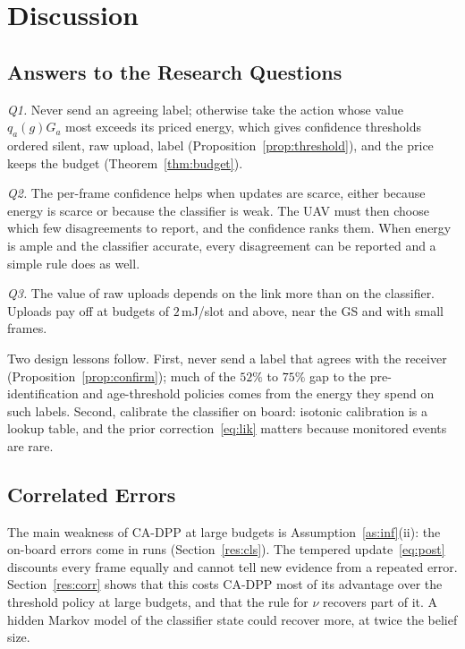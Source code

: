 \documentclass[5p,twocolumn]{elsarticle}
\theoremstyle{remark}
\begin{document}
\section{Discussion}\label{sec:discussion}
\subsection{Answers to the Research Questions}
\emph{Q1.} Never send an agreeing label; otherwise take the action whose value $q_a(g)G_a$ most exceeds its priced energy, which gives confidence thresholds ordered silent, raw upload, label (Proposition~\ref{prop:threshold}), and the price keeps the budget (Theorem~\ref{thm:budget}).

\emph{Q2.} The per-frame confidence helps when updates are scarce, either because energy is scarce or because the classifier is weak. The UAV must then choose which few disagreements to report, and the confidence ranks them. When energy is ample and the classifier accurate, every disagreement can be reported and a simple rule does as well.

\emph{Q3.} The value of raw uploads depends on the link more than on the classifier. Uploads pay off at budgets of $2$\,mJ/slot and above, near the GS and with small frames.

Two design lessons follow. First, never send a label that agrees with the receiver (Proposition~\ref{prop:confirm}); much of the $52\%$ to $75\%$ gap to the pre-identification and age-threshold policies comes from the energy they spend on such labels. Second, calibrate the classifier on board: isotonic calibration is a lookup table, and the prior correction~\eqref{eq:lik} matters because monitored events are rare.

\subsection{Correlated Errors}
The main weakness of CA-DPP at large budgets is Assumption~\ref{as:inf}(ii): the on-board errors come in runs (Section~\ref{res:cls}). The tempered update~\eqref{eq:post} discounts every frame equally and cannot tell new evidence from a repeated error. Section~\ref{res:corr} shows that this costs CA-DPP most of its advantage over the threshold policy at large budgets, and that the rule for $\nu$ recovers part of it. A hidden Markov model of the classifier state could recover more, at twice the belief size.
\end{document}
